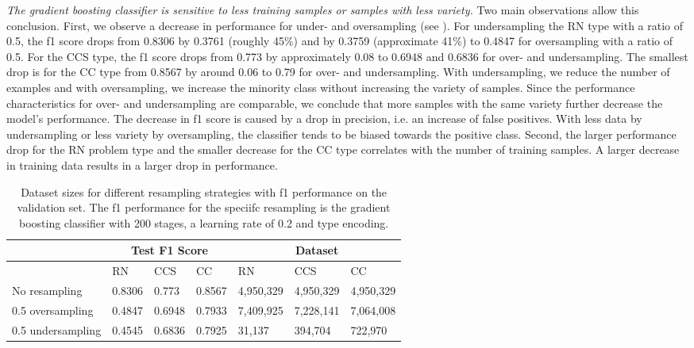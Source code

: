 \textit{The gradient boosting classifier is sensitive to less training samples or samples with less variety.} Two main observations allow this conclusion. First, we observe a decrease in performance for under- and oversampling (see  ). For undersampling the RN type with a ratio of 0.5, the f1 score drops from 0.8306 by 0.3761 (roughly 45\%) and by 0.3759 (approximate 41\%) to 0.4847 for oversampling with a ratio of 0.5. For the CCS type, the f1 score drops from 0.773 by approximately 0.08 to 0.6948 and 0.6836 for over- and undersampling. The smallest drop is for the CC type from 0.8567 by around 0.06 to 0.79 for over- and undersampling. With undersampling, we reduce the number of examples and with oversampling, we increase the minority class without increasing the variety of samples. Since the performance characteristics for over- and undersampling are comparable, we conclude that more samples with the same variety further decrease the model's performance. The decrease in f1 score is caused by a drop in precision, i.e. an increase of false positives. With less data by undersampling or less variety by oversampling, the classifier tends to be biased towards the positive class.
Second, the larger performance drop for the RN problem type and the smaller decrease for the CC type correlates with the number of training samples. A larger decrease in training data results in a larger drop in performance. 

\begin{table}[]
    \tabcolsep=0.11cm
    \begin{tabularx}{\textwidth}{lXXX|XXX}
    \toprule
                        & \multicolumn{3}{c}{Test F1 Score} & \multicolumn{3}{c}{Dataset}   \\ \midrule
                        & RN        & CCS        & CC     & RN            & CCS         & CC          \\ \midrule
    No resampling     &  0.8306   &  0.773    &  0.8567  &  4,950,329    & 4,950,329   & 4,950,329   \\
    0.5 oversampling  &  0.4847   &  0.6948   &  0.7933  &  7,409,925    & 7,228,141   & 7,064,008   \\
    0.5 undersampling &  0.4545   &  0.6836   &  0.7925  &  31,137       & 394,704     & 722,970     \\ \bottomrule
    \end{tabularx}
    \caption{Dataset sizes for different resampling strategies with f1 performance on the validation set. The f1 performance for the speciifc resampling is the gradient boosting classifier with 200 stages, a learning rate of 0.2 and type encoding.}
    \label{tab:resampling_size_performance_gbc}
    \end{table}


